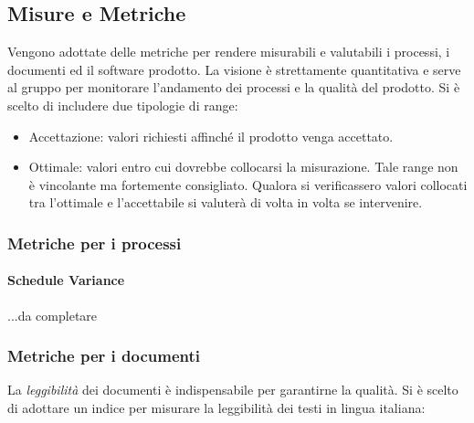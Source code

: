 	\subsection{Misure e Metriche}
	Vengono adottate delle metriche per rendere misurabili e valutabili i processi, i documenti ed il software prodotto. La visione è strettamente quantitativa e serve al gruppo per monitorare l'andamento dei processi e la qualità del prodotto. Si è scelto di includere due tipologie di range:
	\begin{itemize}
		\item Accettazione: valori richiesti affinché il prodotto venga accettato.
		\item Ottimale: valori entro cui dovrebbe collocarsi la misurazione. Tale range non è vincolante ma fortemente consigliato. Qualora si verificassero valori collocati tra l'ottimale e l'accettabile si valuterà di volta in volta se intervenire.
	\end{itemize}
		
		\subsubsection{Metriche per i processi}
			\paragraph{Schedule Variance}		
			...da completare	
			
		\subsubsection{Metriche per i documenti}
		La \emph{leggibilità} dei documenti è indispensabile per garantirne la qualità. Si è scelto di adottare un indice per misurare la leggibilità dei testi in lingua italiana:
